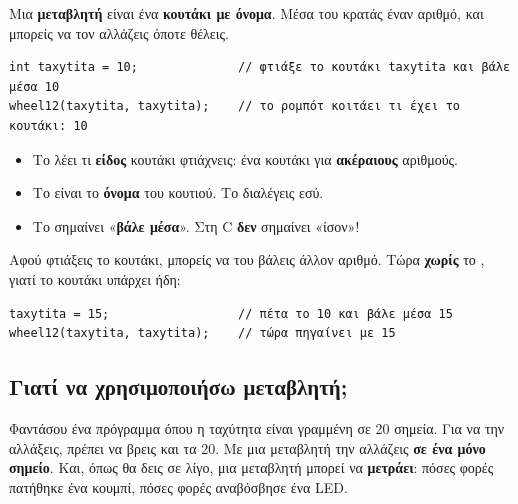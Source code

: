 \documentclass[11pt,a4paper]{article}
\newcommand{\code}[1]{\texttt{\detokenize{#1}}}
\begin{document}
Μια \textbf{μεταβλητή} είναι ένα \textbf{κουτάκι με όνομα}. Μέσα του κρατάς έναν αριθμό, και μπορείς να τον
αλλάζεις όποτε θέλεις.

\begin{center}
\end{center}

\begin{lstlisting}
int taxytita = 10;              // φτιάξε το κουτάκι taxytita και βάλε μέσα 10
wheel12(taxytita, taxytita);    // το ρομπότ κοιτάει τι έχει το κουτάκι: 10
\end{lstlisting}

\begin{itemize}[leftmargin=1.4em]
  \item Το \code{int} λέει τι \textbf{είδος} κουτάκι φτιάχνεις: ένα κουτάκι για \textbf{ακέραιους} αριθμούς.
  \item Το \code{taxytita} είναι το \textbf{όνομα} του κουτιού. Το διαλέγεις εσύ.
  \item Το \code{=} σημαίνει «\textbf{βάλε μέσα}». Στη C \textbf{δεν} σημαίνει «ίσον»!
\end{itemize}

Αφού φτιάξεις το κουτάκι, μπορείς να του βάλεις άλλον αριθμό. Τώρα \textbf{χωρίς} το \code{int}, γιατί το
κουτάκι υπάρχει ήδη:

\begin{lstlisting}
taxytita = 15;                  // πέτα το 10 και βάλε μέσα 15
wheel12(taxytita, taxytita);    // τώρα πηγαίνει με 15
\end{lstlisting}

\subsection*{Γιατί να χρησιμοποιήσω μεταβλητή;}
Φαντάσου ένα πρόγραμμα όπου η ταχύτητα \code{10} είναι γραμμένη σε 20 σημεία. Για να την αλλάξεις, πρέπει να
βρεις και τα 20. Με μια μεταβλητή την αλλάζεις \textbf{σε ένα μόνο σημείο}. Και, όπως θα δεις σε λίγο, μια
μεταβλητή μπορεί να \textbf{μετράει}: πόσες φορές πατήθηκε ένα κουμπί, πόσες φορές αναβόσβησε ένα LED.
\end{document}
